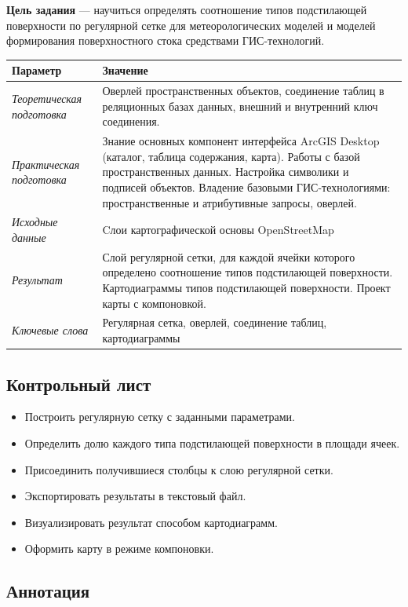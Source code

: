 \documentclass[]{book}
\providecommand{\tightlist}{%
  \setlength{\itemsep}{0pt}\setlength{\parskip}{0pt}}
\theoremstyle{definition}
\theoremstyle{definition}
\theoremstyle{definition}
\theoremstyle{remark}
\begin{document}
\textbf{Цель задания} --- научиться определять соотношение типов
подстилающей поверхности по регулярной сетке для метеорологических
моделей и моделей формирования поверхностного стока средствами
ГИС-технологий.

\begin{longtable}[]{@{}ll@{}}
\toprule
Параметр & Значение\tabularnewline
\midrule
\endhead
\emph{Теоретическая подготовка} & Оверлей пространственных объектов,
соединение таблиц в реляционных базах данных, внешний и внутренний ключ
соединения.\tabularnewline
\emph{Практическая подготовка} & Знание основных компонент интерфейса
ArcGIS Desktop (каталог, таблица содержания, карта). Работы с базой
пространственных данных. Настройка символики и подписей объектов.
Владение базовыми ГИС-технологиями: пространственные и атрибутивные
запросы, оверлей.\tabularnewline
\emph{Исходные данные} & Cлои картографической основы
OpenStreetMap\tabularnewline
\emph{Результат} & Слой регулярной сетки, для каждой ячейки которого
определено соотношение типов подстилающей поверхности. Картодиаграммы
типов подстилающей поверхности. Проект карты с
компоновкой.\tabularnewline
\emph{Ключевые слова} & Регулярная сетка, оверлей, соединение таблиц,
картодиаграммы\tabularnewline
\bottomrule
\end{longtable}

\hypertarget{land-cover-hydro-control}{%
\subsection{Контрольный лист}\label{land-cover-hydro-control}}

\begin{itemize}
\tightlist
\item
  Построить регулярную сетку с заданными параметрами.
\item
  Определить долю каждого типа подстилающей поверхности в площади ячеек.
\item
  Присоединить получившиеся столбцы к слою регулярной сетки.
\item
  Экспортировать результаты в текстовый файл.
\item
  Визуализировать результат способом картодиаграмм.
\item
  Оформить карту в режиме компоновки.
\end{itemize}

\hypertarget{land-cover-hydro-annotation}{%
\subsection{Аннотация}\label{land-cover-hydro-annotation}}
\end{document}
